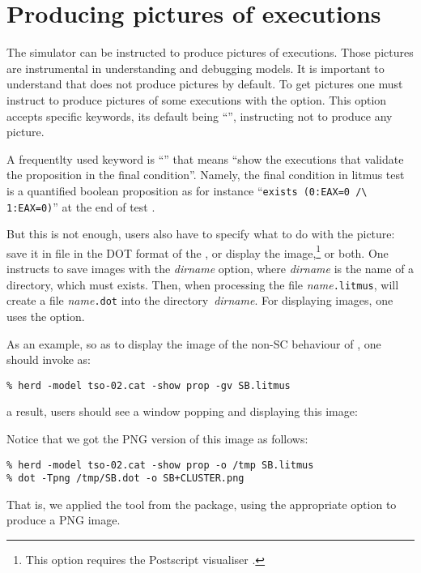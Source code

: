 \section{Producing pictures of executions}
The simulator \herd{} can be instructed to produce pictures of
executions.
Those pictures are instrumental in understanding and
debugging models.
It is important to understand that \herd{} does not produce pictures
by default. To get pictures one must instruct \herd{} to produce
pictures of some executions with the  option.
This option accepts specific keywords, its default being ``'',
instructing \herd{} not to produce any picture.

A frequentlty used keyword is ``'' that means ``show the executions
that validate the proposition in the final condition''.
Namely, the final condition in litmus test is a quantified
boolean proposition as for instance ``\verb+exists (0:EAX=0 /\ 1:EAX=0)+'' at the end of test .

But this is not enough, users also have to specify what to do with the picture:
save it in file in the DOT format of the
, or
display the image,\footnote{This option requires
the Postscript visualiser .} or both.
One instructs  \herd{} to save images with the \textit{dirname} option,
where \textit{dirname} is the name of a directory, which must exists.
Then, when processing the file \textit{name}\texttt{.litmus},
\herd{} will create a file \textit{name}\texttt{.dot} into the
directory~\textit{dirname}.
For displaying images, one uses the  option.

\label{sec:show}As an example,
so as to display the image of the non-SC behaviour of , one
should invoke \herd{} as:
\begin{verbatim}
% herd -model tso-02.cat -show prop -gv SB.litmus
\end{verbatim}
a result, users should see a window popping and displaying this image:
\begin{center}\end{center}
Notice that we got the PNG version of this image as follows:
\begin{verbatim}
% herd -model tso-02.cat -show prop -o /tmp SB.litmus
% dot -Tpng /tmp/SB.dot -o SB+CLUSTER.png
\end{verbatim}
That is, we applied the  tool from the
 package, using the appropriate option
to produce a PNG image.

